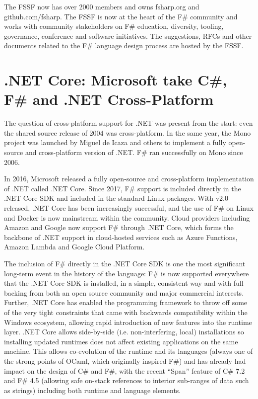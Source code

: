 \documentclass[acmsmall,review]{acmart}\settopmatter{printfolios=true,printccs=false,printacmref=false}
\begin{document}
The FSSF now has over 2000 members and owns fsharp.org and github.com/fsharp. The FSSF is now at the heart of the F\# community and works with community stakeholders on F\# education, diversity, tooling, governance, conference and software initiatives.  The suggestions, RFCs and other documents related to the F\# language design process are hosted by the FSSF. 

\section*{.NET Core: Microsoft take C\#, F\# and .NET Cross-Platform}

The question of cross-platform support for .NET was present from the start: even the shared source release of 2004 was cross-platform.  In the same year, the Mono project was launched by Miguel de Icaza and others to implement a fully open-source and cross-platform version of .NET. F\# ran successfully on Mono since 2006.  

In 2016, Microsoft released a fully open-source and cross-platform implementation of .NET called .NET Core.  Since 2017, F\# support is included directly in the .NET Core SDK and included in the standard Linux packages. With v2.0 released, .NET Core has been increasingly successful, and the use of F\# on Linux and Docker is now mainstream within the community.  Cloud providers including Amazon and Google now support F\# through .NET Core, which forms the backbone of .NET support in cloud-hosted services such as Azure Functions, Amazon Lambda and Google Cloud Platform.

The inclusion of F\# directly in the .NET Core SDK is one the most significant long-term event in the history of the language: F\# is now supported everywhere that the .NET Core SDK is installed, in a simple, consistent way and with full backing from both an open source community and major commercial interests. Further, .NET Core has enabled the programming framework to throw off some of the very tight constraints that came with backwards compatibility within the Windows ecosystem, allowing rapid introduction of new features into the runtime layer. .NET Core allows side-by-side (i.e. non-interfering, local) installations so installing updated runtimes does not affect existing applications on the same machine. This allows co-evolution of the runtime and its languages (always one of the strong points of OCaml, which originally inspired F\#) and has already had impact on the design of C\# and F\#, with the recent “Span” feature of C\# 7.2 and F\# 4.5 (allowing safe on-stack references to interior sub-ranges of data such as strings) including both runtime and language elements.
\end{document}
